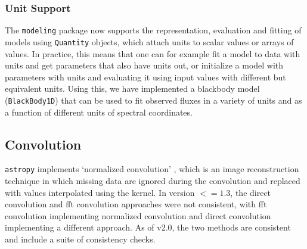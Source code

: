 \documentclass[modern]{aastex61}
\newcommand{\package}[1]{\texttt{#1}\xspace}
\newcommand{\astropypkg}{\package{astropy}}
\begin{document}
\subsubsection{Unit Support}

The \package{modeling} package now supports the representation, evaluation and fitting of models using \texttt{Quantity} objects, which attach units to scalar values or arrays of values. In practice, this means that one can for example fit a model to data with units and get parameters that also have units out, or initialize a model with parameters with units and evaluating it using input values with different but equivalent units. Using this, we have implemented a blackbody model (\texttt{BlackBody1D}) that can be used to fit observed fluxes in a variety of units and as a function of different units of spectral coordinates.

\subsection{Convolution}

\astropypkg implements `normalized convolution' \citep[e.g.,][]{Knutsson1993}, which is an image reconstruction technique in which missing data are ignored during the convolution and replaced with values interpolated using the kernel.   In version $<=1.3$, the direct convolution and fft convolution approaches were not consistent, with fft convolution implementing normalized convolution and direct convolution implementing a different approach.  As of v2.0, the two methods are consistent and include a suite of consistency checks.
\end{document}
